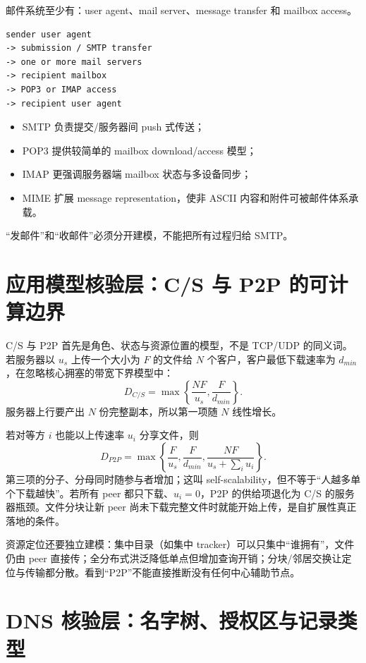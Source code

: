 \documentclass[UTF8,fontset=none,11pt,a4paper]{ctexart}
\providecommand{\tightlist}{\setlength{\itemsep}{0pt}\setlength{\parskip}{0pt}}
\begin{document}
邮件系统至少有：user agent、mail server、message transfer 和 mailbox
access。

\begin{lstlisting}
sender user agent
-> submission / SMTP transfer
-> one or more mail servers
-> recipient mailbox
-> POP3 or IMAP access
-> recipient user agent
\end{lstlisting}

\begin{itemize}
\tightlist
\item
  SMTP 负责提交/服务器间 push 式传送；
\item
  POP3 提供较简单的 mailbox download/access 模型；
\item
  IMAP 更强调服务器端 mailbox 状态与多设备同步；
\item
  MIME 扩展 message representation，使非 ASCII
  内容和附件可被邮件体系承载。
\end{itemize}

``发邮件''和``收邮件''必须分开建模，不能把所有过程归给 SMTP。

\section{应用模型核验层：C/S 与 P2P 的可计算边界}

C/S 与 P2P 首先是角色、状态与资源位置的模型，不是 TCP/UDP 的同义词。若服务器以 $u_s$ 上传一个大小为 $F$ 的文件给 $N$ 个客户，客户最低下载速率为 $d_{min}$，在忽略核心拥塞的带宽下界模型中：
\[
  D_{C/S}=\max\left\{\frac{NF}{u_s},\frac{F}{d_{min}}\right\}.
\]
服务器上行要产出 $N$ 份完整副本，所以第一项随 $N$ 线性增长。

若对等方 $i$ 也能以上传速率 $u_i$ 分享文件，则
\[
  D_{P2P}=\max\left\{\frac{F}{u_s},\frac{F}{d_{min}},
  \frac{NF}{u_s+\sum_i u_i}\right\}.
\]
第三项的分子、分母同时随参与者增加；这叫 self-scalability，但不等于“人越多单个下载越快”。若所有 peer 都只下载、$u_i=0$，P2P 的供给项退化为 C/S 的服务器瓶颈。文件分块让新 peer 尚未下载完整文件时就能开始上传，是自扩展性真正落地的条件。

资源定位还要独立建模：集中目录（如集中 tracker）可以只集中“谁拥有”，文件仍由 peer 直接传；全分布式洪泛降低单点但增加查询开销；分块/邻居交换让定位与传输都分散。看到“P2P”不能直接推断没有任何中心辅助节点。

\section{DNS 核验层：名字树、授权区与记录类型}
\end{document}
